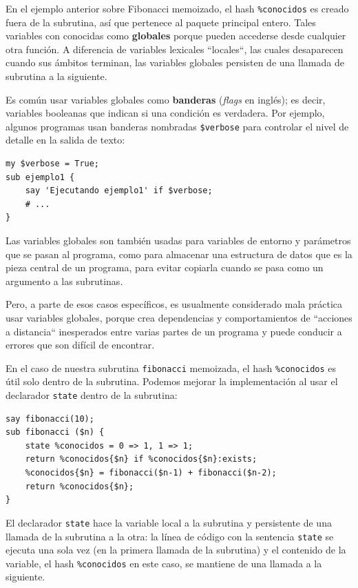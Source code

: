 En el ejemplo anterior sobre Fibonacci memoizado, el hash \verb|%conocidos|
es creado fuera de la subrutina, así que pertenece al 
paquete principal entero. Tales variables con conocidas
como {\bf globales} porque pueden accederse desde cualquier
otra función. A diferencia de variables lexicales ``locales``, 
las cuales desaparecen cuando sus ámbitos terminan, las 
variables globales persisten de una llamada de subrutina 
a la siguiente.

Es común usar variables globales como {\bf banderas} (\emph{flags} en inglés);
es decir, variables booleanas que indican si una condición es
verdadera. Por ejemplo, algunos programas usan banderas nombradas
\verb|$verbose| para controlar el nivel de detalle en la salida de texto:

\begin{verbatim}
my $verbose = True;
sub ejemplo1 {
    say 'Ejecutando ejemplo1' if $verbose;
    # ...
}
\end{verbatim}
%

Las variables globales son también usadas para variables
de entorno y parámetros que se pasan al programa, como 
para almacenar una estructura de datos que es la pieza central
de un programa, para evitar copiarla cuando se pasa como un 
argumento a las subrutinas.

Pero, a parte de esos casos específicos, es usualmente
considerado mala práctica usar variables globales, porque
crea dependencias y comportamientos de ``acciones a distancia``
inesperados entre varias partes de un programa y puede conducir
a errores que son difícil de encontrar.

En el caso de nuestra subrutina \verb|fibonacci| memoizada,
el hash \verb|%conocidos| es útil solo dentro de la subrutina.
Podemos mejorar la implementación al usar el declarador \verb|state|
dentro de la subrutina:

\begin{verbatim}
say fibonacci(10);
sub fibonacci ($n) {
    state %conocidos = 0 => 1, 1 => 1;
    return %conocidos{$n} if %conocidos{$n}:exists;
    %conocidos{$n} = fibonacci($n-1) + fibonacci($n-2);
    return %conocidos{$n};
}
\end{verbatim}
%
El declarador \verb|state| hace la variable local a la subrutina
y persistente de una llamada de la subrutina a la otra: la línea de
código con la sentencia \verb|state| se ejecuta una sola vez 
(en la primera llamada de la subrutina) y el contenido de la 
variable, el hash \verb|%conocidos| en este caso, se mantiene
de una llamada a la siguiente.


